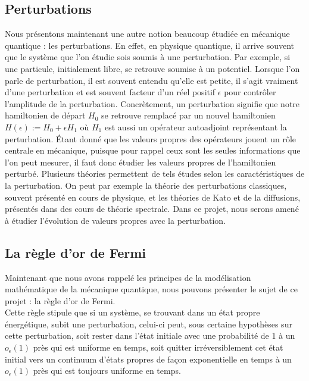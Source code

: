 \documentclass[12pt,openany,a4paper, titlepage]{article}
\theoremstyle{definition}
\theoremstyle{definition}
\theoremstyle{definition}
\theoremstyle{definition}
\theoremstyle{definition}
\theoremstyle{definition}
\begin{document}
\subsection{Perturbations}

Nous présentons maintenant une autre notion beaucoup étudiée en mécanique quantique : les perturbations.
En effet, en physique quantique, il arrive souvent que le système que l'on étudie sois soumis à une perturbation. Par exemple, si une particule, initialement libre, se retrouve soumise à un potentiel. Lorsque l'on parle de perturbation, il est souvent entendu qu'elle est petite, il s'agit vraiment d'une perturbation et est souvent facteur d'un réel positif $\epsilon$ pour contrôler l'amplitude de la perturbation.
Concrètement, un perturbation signifie que notre hamiltonien de départ $H_0$ se retrouve remplacé par un nouvel hamiltonien $H(\epsilon) := H_0 + \epsilon H_1$ où $H_1$ est aussi un opérateur autoadjoint représentant la perturbation. Étant donné que les valeurs propres des opérateurs jouent un rôle centrale en mécanique, puisque pour rappel ceux sont les seules informations que l'on peut mesurer, il faut donc étudier les valeurs propres de l'hamiltonien perturbé. Plusieurs théories permettent de tels études selon les caractéristiques de la perturbation. On peut par exemple la théorie des perturbations classiques, souvent présenté en cours de physique, et les théories de Kato et de la diffusions, présentés dans des cours de théorie spectrale. Dans ce projet, nous serons amené à étudier l'évolution de valeurs propres avec la perturbation.

\newpage
\subsection{La règle d'or de Fermi} 

Maintenant que nous avons rappelé les principes de la modélisation mathématique de la mécanique quantique, nous pouvons présenter le sujet de ce projet : la règle d'or de Fermi. \\

Cette règle stipule que si un système, se trouvant dans un état propre énergétique, subit une perturbation, celui-ci peut, sous certaine hypothèses sur cette perturbation, soit rester dans l'état initiale avec une probabilité de 1 à un $o_\epsilon(1)$ près qui est uniforme en temps, soit quitter irréversiblement cet état initial vers un continuum d'états propres de façon exponentielle en temps à un $o_\epsilon(1)$ près qui est toujours uniforme en temps.\\
\end{document}
